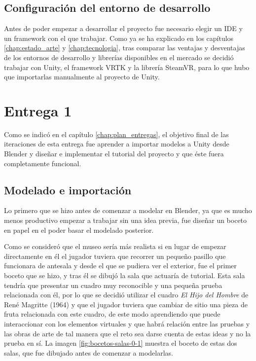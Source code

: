 \subsection{Configuración del entorno de desarrollo}

Antes de poder empezar a desarrollar el proyecto fue necesario elegir un \acs{IDE} y un framework con el que trabajar. Como ya se ha explicado en los capítulos \ref{chap:estado_arte} y \ref{chap:tecnologia}, tras comparar las ventajas y desventajas de los entornos de desarrollo y librerías disponibles en el mercado se decidió trabajar con Unity, el framework \acs{VRTK} y la librería SteamVR, para lo que hubo que importarlas manualmente al proyecto de Unity.

\section{Entrega 1}

Como se indicó en el capítulo \ref{chap:plan_entregas}, el objetivo final de las iteraciones de esta entrega fue aprender a importar modelos a Unity desde Blender y diseñar e implementar el tutorial del proyecto y que éste fuera completamente funcional. 

\subsection{Modelado e importación}

Lo primero que se hizo antes de comenzar a modelar en Blender, ya que es mucho menos productivo empezar a trabajar sin una idea previa, fue diseñar un boceto en papel en el poder basar el modelado posterior.

Como se consideró que el museo sería más realista si en lugar de empezar directamente en él el jugador tuviera que recorrer un pequeño pasillo que funcionara de antesala y desde el que se pudiera ver el exterior, fue el primer boceto que se hizo, y tras él se dibujó la sala que actuaría de tutorial. Esta sala tendría que presentar un cuadro muy reconocible y una pequeña prueba relacionada con él, por lo que se decidió utilizar el cuadro \textit{El Hijo del Hombre} de René Magritte (1964) y que el jugador tuviera que cambiar de sitio una pieza de fruta relacionada con este cuadro, de este modo aprendiendo que puede interaccionar con los elementos virtuales y que habrá relación entre las pruebas y las obras de arte de tal manera que el reto sea darse cuenta de estas ideas y no la prueba en sí. La imagen \ref{fig:bocetos-salas-0-1} muestra el boceto de estas dos salas, que fue dibujado antes de comenzar a modelarlas.

